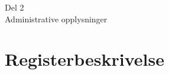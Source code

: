 \documentclass{article}
\begin{document}
    
    \newpage
    
    
    
    \begin{center}
        \huge
        Del 2 \\
        \vspace{5mm}
        Administrative opplysninger
        \normalsize
    \end{center}
    \newpage
    
    
    
    \section{Registerbeskrivelse}
    
\end{document}

